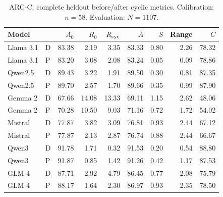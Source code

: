 \begin{table}[H]
\centering\small\setlength{\tabcolsep}{5pt}
\caption{ARC-C: complete heldout before/after cyclic metrics. Calibration: $n=58$. Evaluation: $N=1107$.}\label{tab:corrected-arc}
\begin{tabular}{llrrrrrrr}
\toprule
Model &  & $A_0$ & $R_0$ & $R_{\rm cyc}$ & $\bar A$ & $S$ & Range & $C$\\
\midrule
Llama 3.1 & D & 83.38 & 2.19 & 3.35 & 83.33 & 0.80 & 2.26 & 78.32\\
Llama 3.1 & P & 83.20 & 3.08 & 2.08 & 83.24 & 0.05 & 0.09 & 78.86\\
Qwen2.5 & D & 89.43 & 3.22 & 1.91 & 89.50 & 0.30 & 0.81 & 87.35\\
Qwen2.5 & P & 89.70 & 2.57 & 1.70 & 89.66 & 0.35 & 0.99 & 87.90\\
Gemma 2 & D & 67.66 & 14.08 & 13.33 & 69.11 & 1.15 & 2.62 & 48.06\\
Gemma 2 & P & 70.28 & 10.50 & 9.03 & 71.16 & 0.72 & 1.72 & 54.02\\
Mistral & D & 77.87 & 3.82 & 3.09 & 76.81 & 0.93 & 2.44 & 67.12\\
Mistral & P & 77.87 & 2.13 & 2.87 & 76.74 & 0.88 & 2.44 & 66.67\\
Qwen3 & D & 91.78 & 1.71 & 0.32 & 91.53 & 0.20 & 0.54 & 88.80\\
Qwen3 & P & 91.87 & 0.85 & 1.42 & 91.26 & 0.42 & 1.17 & 87.53\\
GLM 4 & D & 87.71 & 2.92 & 4.79 & 86.45 & 0.77 & 2.08 & 75.79\\
GLM 4 & P & 88.17 & 1.64 & 2.30 & 86.97 & 0.93 & 2.35 & 78.50\\
\bottomrule
\end{tabular}
\end{table}


